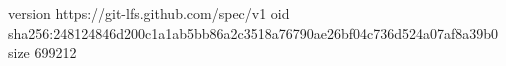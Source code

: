 version https://git-lfs.github.com/spec/v1
oid sha256:248124846d200c1a1ab5bb86a2c3518a76790ae26bf04c736d524a07af8a39b0
size 699212
